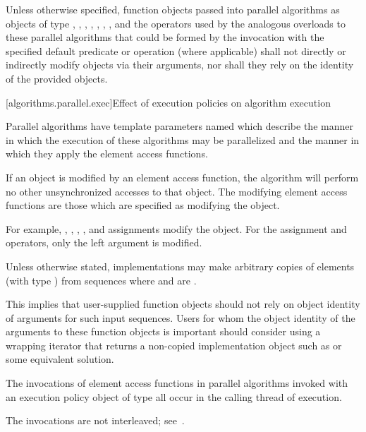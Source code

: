 \pnum
Unless otherwise specified, function objects passed into parallel algorithms as
objects of type , , ,
, , ,
, and the operators used by the analogous overloads to
these parallel algorithms that could be formed by the invocation with the
specified default predicate or operation (where applicable) shall not directly
or indirectly modify objects via their arguments, nor shall they rely on the
identity of the provided objects.

[algorithms.parallel.exec]{Effect of execution policies on algorithm execution}

\pnum
Parallel algorithms have template parameters
named 
which describe the manner in which the execution of these algorithms may be
parallelized and the manner in which they apply the element access functions.

\pnum
If an object is modified by an element access function,
the algorithm will perform no other unsynchronized accesses to that object.
The modifying element access functions are those
which are specified as modifying the object.
\begin{note}
For example,
, \tcode{++}, \tcode{--}, , and assignments
modify the object.
For the assignment and  operators,
only the left argument is modified.
\end{note}

\pnum
Unless otherwise stated, implementations may make arbitrary copies of elements
(with type ) from sequences where 
and  are .
\begin{note}
This implies that user-supplied function objects should not rely on object
identity of arguments for such input sequences. Users for whom the object
identity of the arguments to these function objects is important should
consider using a wrapping iterator that returns a non-copied implementation
object such as  or some equivalent
solution.
\end{note}

\pnum
The invocations of element access functions in parallel algorithms invoked with
an execution policy object of type  all occur
in the calling thread of execution.
\begin{note}
The invocations are not interleaved; see~.
\end{note}

